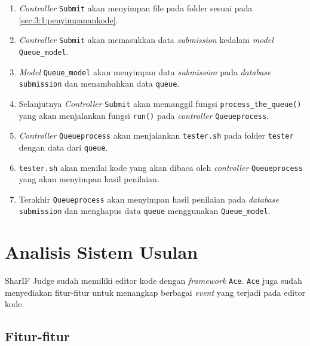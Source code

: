 \begin{enumerate}
      \item \textit{Controller} \verb|Submit| akan menyimpan file pada folder sesuai pada \ref{sec:3:1:penyimpanankode}.
      \item \textit{Controller} \verb|Submit| akan memasukkan data \textit{submission} kedalam \textit{model} \verb|Queue_model|.
      \item \textit{Model} \verb|Queue_model| akan menyimpan data \textit{submission} pada \textit{database} \verb|submission| dan menambahkan data \verb|queue|.
      \item Selanjutnya \textit{Controller} \verb|Submit| akan memanggil fungsi \verb|process_the_queue()| yang akan menjalankan fungsi \verb|run()| pada \textit{controller} \verb|Queueprocess|.
      \item \textit{Controller} \verb|Queueprocess| akan menjalankan \verb|tester.sh| pada folder \verb|tester| dengan data dari \verb|queue|.
      \item \verb|tester.sh| akan menilai kode yang akan dibaca oleh \textit{controller} \verb|Queueprocess| yang akan menyimpan hasil penilaian.
      \item Terakhir \verb|Queueprocess| akan menyimpan hasil penilaian pada \textit{database} \verb|submission| dan menghapus data \verb|queue| menggunakan \verb|Queue_model|.
\end{enumerate}


\section{Analisis Sistem Usulan}
\label{sec:3:sistemusulan}

SharIF Judge sudah memiliki editor kode dengan \textit{framework} \verb|Ace|. \verb|Ace| juga sudah menyediakan fitur-fitur untuk menangkap berbagai \textit{event} yang terjadi pada editor kode.

\subsection{Fitur-fitur}
\label{sec:3:2:fitur}


